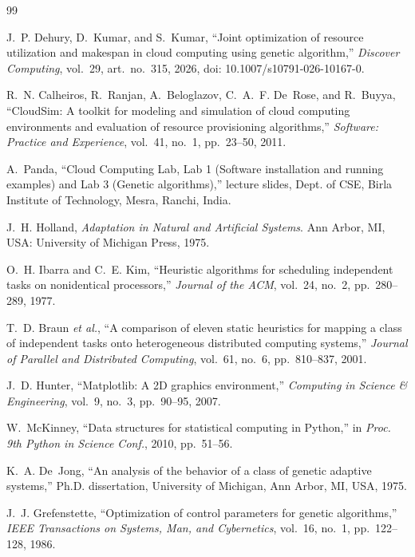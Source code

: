 \documentclass[journal,onecolumn,12pt]{IEEEtran}
\begin{document}
\begin{thebibliography}{99}

J.~P. Dehury, D.~Kumar, and S.~Kumar,
``Joint optimization of resource utilization and makespan in cloud computing using genetic algorithm,''
\emph{Discover Computing}, vol.~29, art.~no.~315, 2026, doi: 10.1007/s10791-026-10167-0.

R.~N. Calheiros, R.~Ranjan, A.~Beloglazov, C.~A.~F. De~Rose, and R.~Buyya,
``CloudSim: A toolkit for modeling and simulation of cloud computing environments and evaluation of resource provisioning algorithms,''
\emph{Software: Practice and Experience}, vol.~41, no.~1, pp.~23--50, 2011.

A.~Panda,
``Cloud Computing Lab, Lab 1 (Software installation and running examples) and Lab 3 (Genetic algorithms),''
lecture slides, Dept. of CSE, Birla Institute of Technology, Mesra, Ranchi, India.

J.~H. Holland,
\emph{Adaptation in Natural and Artificial Systems}.
Ann Arbor, MI, USA: University of Michigan Press, 1975.

O.~H. Ibarra and C.~E. Kim,
``Heuristic algorithms for scheduling independent tasks on nonidentical processors,''
\emph{Journal of the ACM}, vol.~24, no.~2, pp.~280--289, 1977.

T.~D. Braun \emph{et al.},
``A comparison of eleven static heuristics for mapping a class of independent tasks onto heterogeneous distributed computing systems,''
\emph{Journal of Parallel and Distributed Computing}, vol.~61, no.~6, pp.~810--837, 2001.

J.~D. Hunter,
``Matplotlib: A 2D graphics environment,''
\emph{Computing in Science \& Engineering}, vol.~9, no.~3, pp.~90--95, 2007.

W.~McKinney,
``Data structures for statistical computing in Python,''
in \emph{Proc. 9th Python in Science Conf.}, 2010, pp.~51--56.

K.~A. De~Jong,
``An analysis of the behavior of a class of genetic adaptive systems,''
Ph.D. dissertation, University of Michigan, Ann Arbor, MI, USA, 1975.

J.~J. Grefenstette,
``Optimization of control parameters for genetic algorithms,''
\emph{IEEE Transactions on Systems, Man, and Cybernetics}, vol.~16, no.~1, pp.~122--128, 1986.


\end{thebibliography}
\end{document}
